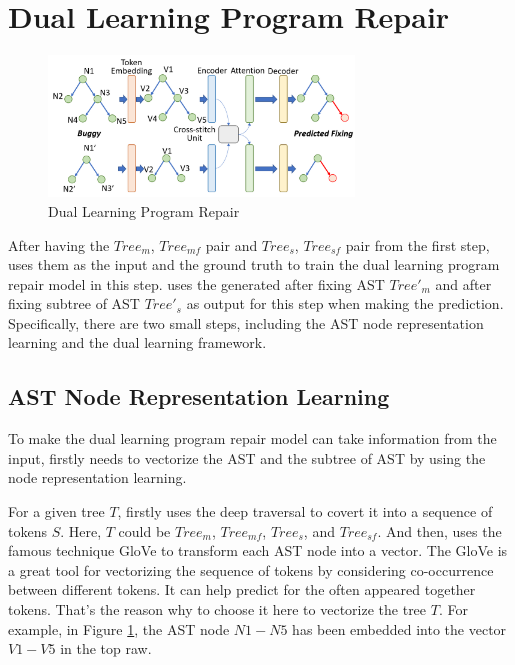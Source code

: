\section{Dual Learning Program Repair}

\begin{figure}[t]
	\centering
	\includegraphics[width=3.2in]{graphs/program_repair.png}
	\caption{Dual Learning Program Repair}
	\label{program-repair}
\end{figure}

After having the $Tree_m$, $Tree_{mf}$ pair and $Tree_s$, $Tree_{sf}$ pair from the first step, \tool uses them as the input and the ground truth to train the dual learning program repair model in this step. \tool uses the generated after fixing AST $Tree'_m$ and after fixing subtree of AST $Tree'_s$ as output for this step when making the prediction. Specifically, there are two small steps, including the AST node representation learning and the dual learning framework.


\subsection{AST Node Representation Learning}

To make the dual learning program repair model can take information from the input, \tool firstly needs to vectorize the AST and the subtree of AST by using the node representation learning. 

For a given tree $T$, \tool firstly uses the deep traversal to covert it into a sequence of tokens $S$. Here, $T$ could be $Tree_m$, $Tree_{mf}$, $Tree_s$, and $Tree_{sf}$. And then, \tool uses the famous technique GloVe \cite{pennington2014glove} to transform each AST node into a vector. The GloVe is a great tool for vectorizing the sequence of tokens by considering co-occurrence between different tokens. It can help predict for the often appeared together tokens. That's the reason why to choose it here to vectorize the tree $T$. For example, in Figure \ref{program-repair}, the AST node $N1-N5$ has been embedded into the vector $V1-V5$ in the top raw.

